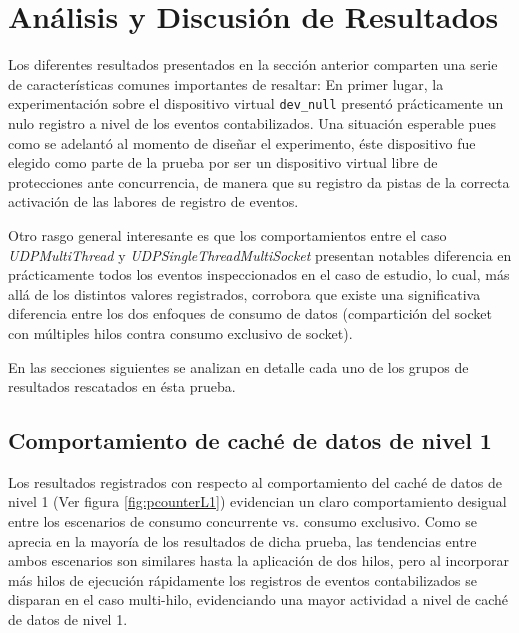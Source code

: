 \section{Análisis y Discusión de Resultados}

Los diferentes resultados presentados en la sección anterior comparten una serie de características comunes importantes de resaltar: En primer lugar, la experimentación sobre el dispositivo virtual \verb=dev_null= presentó prácticamente un nulo registro a nivel de los eventos contabilizados. Una situación esperable pues como se adelantó al momento de diseñar el experimento, éste dispositivo fue elegido como parte de la prueba por ser un dispositivo virtual libre de protecciones ante concurrencia, de manera que su registro da pistas de la correcta activación de las labores de registro de eventos.

Otro rasgo general interesante es que los comportamientos entre el caso \emph{UDPMultiThread} y \emph{UDPSingleThreadMultiSocket} presentan notables diferencia en prácticamente todos los eventos inspeccionados en el caso de estudio, lo cual, más allá de los distintos valores registrados, corrobora que existe una significativa diferencia entre los dos enfoques de consumo de datos (compartición del socket con múltiples hilos contra consumo exclusivo de socket).

En las secciones siguientes se analizan en detalle cada uno de los grupos de resultados rescatados en ésta prueba.

\subsection{Comportamiento de caché de datos de nivel 1}
Los resultados registrados con respecto al comportamiento del caché de datos de nivel 1 (Ver figura \ref{fig:pcounterL1}) evidencian un claro comportamiento desigual entre los escenarios de consumo concurrente vs. consumo exclusivo. Como se aprecia en la mayoría de los resultados de dicha prueba, las tendencias entre ambos escenarios son similares hasta la aplicación de dos hilos, pero al incorporar más hilos de ejecución rápidamente los registros de eventos contabilizados se disparan en el caso multi-hilo, evidenciando una mayor actividad a nivel de caché de datos de nivel 1.

